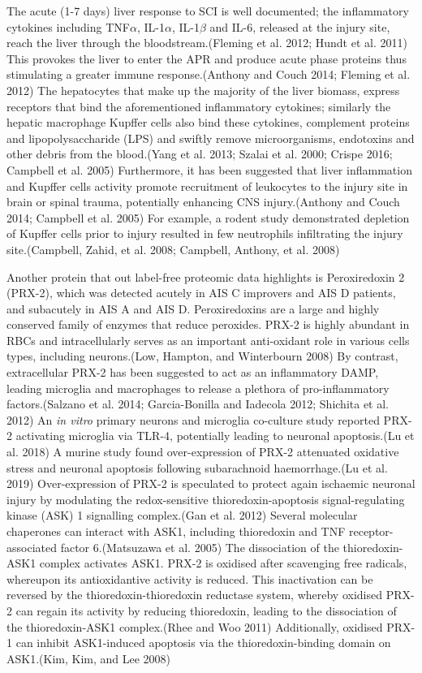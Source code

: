 \documentclass[9pt,lineno]{elife}
\begin{document}
\begin{landscape}
\begin{landscape}
The acute (1-7 days) liver response to SCI is well documented; the inflammatory cytokines including TNF\(\alpha\), IL-1\(\alpha\), IL-1\(\beta\) and IL-6, released at the injury site, reach the liver through the bloodstream.(Fleming et al. 2012; Hundt et al. 2011) This provokes the liver to enter the APR and produce acute phase proteins thus stimulating a greater immune response.(Anthony and Couch 2014; Fleming et al. 2012) The hepatocytes that make up the majority of the liver biomass, express receptors that bind the aforementioned inflammatory cytokines; similarly the hepatic macrophage Kupffer cells also bind these cytokines, complement proteins and lipopolysaccharide (LPS) and swiftly remove microorganisms, endotoxins and other debris from the blood.(Yang et al. 2013; Szalai et al. 2000; Crispe 2016; Campbell et al. 2005) Furthermore, it has been suggested that liver inflammation and Kupffer cells activity promote recruitment of leukocytes to the injury site in brain or spinal trauma, potentially enhancing CNS injury.(Anthony and Couch 2014; Campbell et al. 2005) For example, a rodent study demonstrated depletion of Kupffer cells prior to injury resulted in few neutrophils infiltrating the injury site.(Campbell, Zahid, et al. 2008; Campbell, Anthony, et al. 2008)

Another protein that out label-free proteomic data highlights is Peroxiredoxin 2 (PRX-2), which was detected acutely in AIS C improvers and AIS D patients, and subacutely in AIS A and AIS D. Peroxiredoxins are a large and highly conserved family of enzymes that reduce peroxides.
PRX-2 is highly abundant in RBCs and intracellularly serves as an important anti-oxidant role in various cells types, including neurons.(Low, Hampton, and Winterbourn 2008) By contrast, extracellular PRX-2 has been suggested to act as an inflammatory DAMP, leading microglia and macrophages to release a plethora of pro-inflammatory factors.(Salzano et al. 2014; Garcia-Bonilla and Iadecola 2012; Shichita et al. 2012) An \emph{in vitro} primary neurons and microglia co-culture study reported PRX-2 activating microglia via TLR-4, potentially leading to neuronal apoptosis.(Lu et al. 2018) A murine study found over-expression of PRX-2 attenuated oxidative stress and neuronal apoptosis following subarachnoid haemorrhage.(Lu et al. 2019) Over-expression of PRX-2 is speculated to protect again ischaemic neuronal injury by modulating the redox-sensitive thioredoxin-apoptosis signal-regulating kinase (ASK) 1 signalling complex.(Gan et al. 2012) Several molecular chaperones can interact with ASK1, including thioredoxin and TNF receptor-associated factor 6.(Matsuzawa et al. 2005) The dissociation of the thioredoxin-ASK1 complex activates ASK1.
PRX-2 is oxidised after scavenging free radicals, whereupon its antioxidantive activity is reduced.
This inactivation can be reversed by the thioredoxin-thioredoxin reductase system, whereby oxidised PRX-2 can regain its activity by reducing thioredoxin, leading to the dissociation of the thioredoxin-ASK1 complex.(Rhee and Woo 2011) Additionally, oxidised PRX-1 can inhibit ASK1-induced apoptosis via the thioredoxin-binding domain on ASK1.(Kim, Kim, and Lee 2008)


\end{landscape}
\end{landscape}
\end{document}
